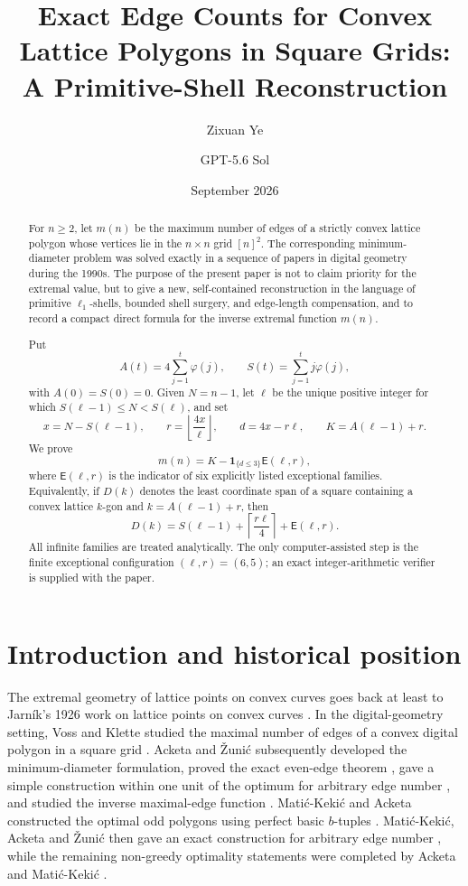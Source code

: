 \documentclass[11pt]{article}
\title{\textbf{Exact Edge Counts for Convex Lattice Polygons in Square Grids:\\
A Primitive-Shell Reconstruction}}
\author{Zixuan Ye \and GPT-5.6 Sol}
\date{September 2026}
\theoremstyle{definition}
\newcommand{\E}{\mathsf E}
\newcommand{\one}{\mathbf 1}
\newcommand{\ph}{\varphi}
\begin{document}
\maketitle

\begin{abstract}
For \(n\ge2\), let \(m(n)\) be the maximum number of edges of a strictly convex lattice polygon whose vertices lie in the \(n\times n\) grid \([n]^2\).  The corresponding minimum-diameter problem was solved exactly in a sequence of papers in digital geometry during the 1990s.  The purpose of the present paper is not to claim priority for the extremal value, but to give a new, self-contained reconstruction in the language of primitive \(\ell_1\)-shells, bounded shell surgery, and edge-length compensation, and to record a compact direct formula for the inverse extremal function \(m(n)\).

Put
\[
A(t)=4\sum_{j=1}^t\ph(j),\qquad
S(t)=\sum_{j=1}^t j\ph(j),
\]
with \(A(0)=S(0)=0\).  Given \(N=n-1\), let \(\ell\) be the unique positive integer for which
\(S(\ell-1)\le N<S(\ell)\), and set
\[
x=N-S(\ell-1),\qquad
r=\left\lfloor\frac{4x}{\ell}\right\rfloor,\qquad
d=4x-r\ell,\qquad
K=A(\ell-1)+r.
\]
We prove
\[
m(n)=K-\one_{\{d\le3\}}\E(\ell,r),
\]
where \(\E(\ell,r)\) is the indicator of six explicitly listed exceptional families.  Equivalently, if \(D(k)\) denotes the least coordinate span of a square containing a convex lattice \(k\)-gon and \(k=A(\ell-1)+r\), then
\[
D(k)=S(\ell-1)+\left\lceil\frac{r\ell}{4}\right\rceil+\E(\ell,r).
\]
All infinite families are treated analytically.  The only computer-assisted step is the finite exceptional configuration \((\ell,r)=(6,5)\); an exact integer-arithmetic verifier is supplied with the paper.
\end{abstract}

\section{Introduction and historical position}

The extremal geometry of lattice points on convex curves goes back at least to Jarník's 1926 work on lattice points on convex curves \cite{Jarnik1926}.  In the digital-geometry setting, Voss and Klette studied the maximal number of edges of a convex digital polygon in a square grid \cite{VossKlette1982}.  Acketa and Žunić subsequently developed the minimum-diameter formulation, proved the exact even-edge theorem \cite{AcketaZunic1993}, gave a simple construction within one unit of the optimum for arbitrary edge number \cite{AcketaZunic1994}, and studied the inverse maximal-edge function \cite{AcketaZunic1995}.  Matić-Kekić and Acketa constructed the optimal odd polygons using perfect basic \(b\)-tuples \cite{MaticKekicAcketa1995}.  Matić-Kekić, Acketa and Žunić then gave an exact construction for arbitrary edge number \cite{MaticKekicAcketaZunic1996}, while the remaining non-greedy optimality statements were completed by Acketa and Matić-Kekić \cite{AcketaMaticKekic1997}.
\end{document}
